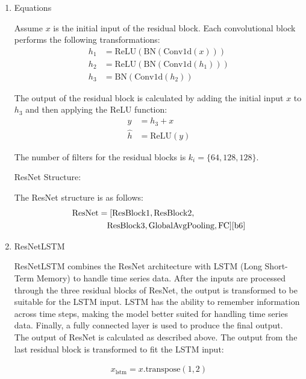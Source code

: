 \documentclass[conference]{IEEEtran}
\begin{document}
\begin{enumerate}
  \item Equations
  
  Assume $x$ is the initial input of the residual block. Each convolutional block performs the following transformations:
  \begin{align*}
    h_1 &= \text{ReLU}(\text{BN}(\text{Conv1d}(x))) \\
    h_2 &= \text{ReLU}(\text{BN}(\text{Conv1d}(h_1))) \\
    h_3 &= \text{BN}(\text{Conv1d}(h_2))
  \end{align*}

  The output of the residual block is calculated by adding the initial input $x$ to $h_3$ and then applying the ReLU function:
  \begin{align*}
    y &= h_3 + x \\
    \hat{h} &= \text{ReLU}(y)
  \end{align*}

  The number of filters for the residual blocks is $k_i = \{64, 128, 128\}$.

  \vspace{0.5cm}  %

  ResNet Structure:

  The ResNet structure is as follows: \\
  \begin{align*}
    \text{ResNet} &= [\text{ResBlock1}, \text{ResBlock2}, \\
                    &\quad \text{ResBlock3}, \text{GlobalAvgPooling}, \text{FC}] \cite{b6}
  \end{align*}
    
  \item ResNetLSTM
  
    ResNetLSTM combines the ResNet architecture with LSTM (Long Short-Term Memory) to handle time series data. After the inputs are processed through the three residual blocks of ResNet, the output is transformed to be suitable for the LSTM input. LSTM has the ability to remember information across time steps, making the model better suited for handling time series data. Finally, a fully connected layer is used to produce the final output. \cite{b16} \\ 
    The output of ResNet is calculated as described above. The output from the last residual block is transformed to fit the LSTM input:

    \begin{align*}
        x_{\text{lstm}} = x.\text{transpose}(1, 2)
    \end{align*}
    

\end{enumerate}
\end{document}
